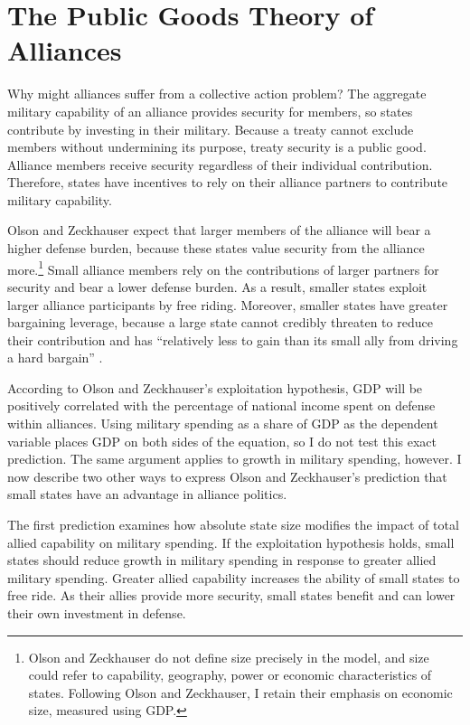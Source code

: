 \documentclass[12pt]{article}
\begin{document}
\section{The Public Goods Theory of Alliances}


Why might alliances suffer from a collective action problem? 
The aggregate military capability of an alliance provides security for members, so states contribute by investing in their military.
Because a treaty cannot exclude members without undermining its purpose, treaty security is a public good. 
Alliance members receive security regardless of their individual contribution. 
Therefore, states have incentives to rely on their alliance partners to contribute military capability. 

 
Olson and Zeckhauser expect that larger members of the alliance will bear a higher defense burden, because these states value security from the alliance more.\footnote{Olson and Zeckhauser do not define size precisely in the model, and size could refer to capability, geography, power or economic characteristics of states. Following Olson and Zeckhauser, I retain their emphasis on economic size, measured using GDP.}
Small alliance members rely on the contributions of larger partners for security and bear a lower defense burden.
As a result, smaller states exploit larger alliance participants by free riding. 
Moreover, smaller states have greater bargaining leverage, because a large state cannot credibly threaten to reduce their contribution and has ``relatively less to gain than its small ally from driving a hard bargain'' \citep[pg. 274]{OlsonZeckhauser1966}. 


According to Olson and Zeckhauser's exploitation hypothesis, GDP will be positively correlated with the percentage of national income spent on defense within alliances.
Using military spending as a share of GDP as the dependent variable places GDP on both sides of the equation, so I do not test this exact prediction. 
The same argument applies to growth in military spending, however. 
I now describe two other ways to express Olson and Zeckhauser's prediction that small states have an advantage in alliance politics. 


The first prediction examines how absolute state size modifies the impact of total allied capability on military spending. 
If the exploitation hypothesis holds, small states should reduce growth in military spending in response to greater allied military spending.  
Greater allied capability increases the ability of small states to free ride. 
As their allies provide more security, small states benefit and can lower their own investment in defense. 
\end{document}
